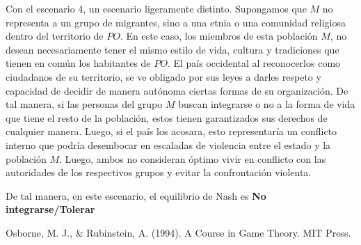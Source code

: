 \documentclass{homework}
\begin{document}
Con el escenario 4, un escenario ligeramente distinto. Supongamos que $M$ no representa a un grupo de migrantes, sino a una etnia o una comunidad religiosa dentro del territorio de $PO$. En este caso, los miembros de esta población $M$, no desean necesariamente tener el mismo estilo de vida, cultura y tradiciones que tienen en común los habitantes de $PO$. El país occidental al reconocerlos como ciudadanos de su territorio, se ve obligado por sus leyes a darles respeto y capacidad de decidir de manera autónoma ciertas formas de su organización. De tal manera, si las personas del grupo $M$ buscan integrarse o no a la forma de vida que tiene el resto de la población, estos tienen garantizados sus derechos de cualquier manera. Luego, si el país los acosara, esto representaría un conflicto interno que podría desembocar en escaladas de violencia entre el estado y la población $M$. Luego, ambos no consideran óptimo vivir en conflicto con las autoridades de los respectivos grupos y evitar la confrontación violenta. \newline

De tal manera, en este escenario, el equilibrio de Nash es \textbf{No integrarse/Tolerar} \newline








Osborne, M. J., & Rubinstein, A. (1994). A Course in Game Theory. MIT Press.
\end{document}
